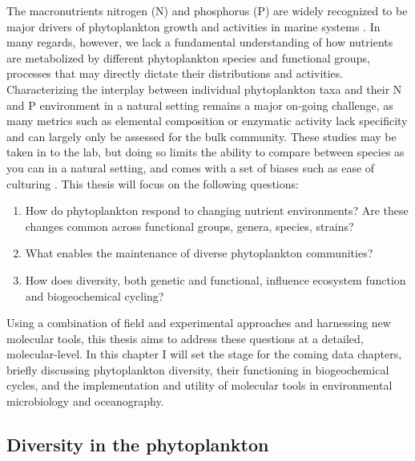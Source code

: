 The macronutrients nitrogen (N) and phosphorus (P) are widely recognized to be major drivers of phytoplankton growth and activities in marine systems \citep{Moore2004}. In many regards, however, we lack a fundamental understanding of how nutrients are metabolized by different phytoplankton species and functional groups, processes that may directly dictate their distributions and activities. Characterizing the interplay between individual phytoplankton taxa and their N and P environment in a natural setting remains a major on-going challenge, as many metrics such as elemental composition or enzymatic activity lack specificity and can largely only be assessed for the bulk community. These studies may be taken in to the lab, but doing so limits the ability to compare between species as you can in a natural setting, and comes with a set of biases such as ease of culturing \citep{Lakeman2009}.  This thesis will focus on the following questions: \par

\begin{enumerate}
  \item How do phytoplankton respond to changing nutrient environments? Are these changes common across functional groups, genera, species, strains? 
  \item What enables the maintenance of diverse phytoplankton communities? 
  \item How does diversity, both genetic and functional, influence ecosystem function and biogeochemical cycling? 
      
\end{enumerate}

Using a combination of field and experimental approaches and harnessing new molecular tools, this thesis aims to address these questions at a detailed, molecular-level. In this chapter I will set the stage for the coming data chapters, briefly discussing phytoplankton diversity, their functioning in biogeochemical cycles, and the implementation and utility of molecular tools in environmental microbiology and oceanography. 

\subsection{Diversity in the phytoplankton}

